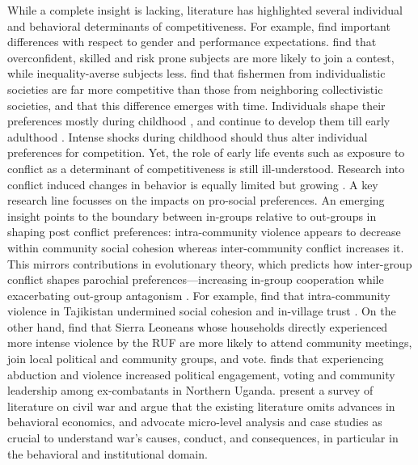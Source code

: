While a complete insight is lacking, literature has highlighted several individual and behavioral determinants of competitiveness. For example, \cite{Niederle2007} find important differences with respect to gender and performance expectations. \cite{Bartling2009b} find that overconfident, skilled and risk prone subjects are more likely to join a contest, while inequality-averse subjects less. \cite{Leibbrandt2013} find that fishermen from individualistic societies are far more competitive than those from neighboring collectivistic societies, and that this difference emerges with time. Individuals shape their preferences mostly during childhood \citep{Benenson2007,Fehr2008}, and continue to develop them till early adulthood \citep{Sutter2007a}. Intense shocks during childhood should thus alter individual preferences for competition. Yet, the role of early life events such as exposure to conflict as a determinant of competitiveness is still ill-understood.
Research into conflict induced changes in behavior is equally limited but growing \citep{Blattman2010b}. A key research line focusses on the impacts on pro-social preferences. An emerging insight points to the boundary between in-groups relative to out-groups in shaping post conflict preferences: intra-community violence appears to decrease within community social cohesion whereas inter-community conflict increases it. This mirrors contributions in evolutionary theory, which predicts how inter-group conflict shapes parochial preferences—increasing in-group cooperation while exacerbating out-group antagonism \citep{Bowles2006b,Bernhard2006b,Choi2007a}. For example, \cite{CassarAlessandra} find that intra-community violence in Tajikistan undermined social cohesion and in-village trust \citep[see also][]{Rohner2013}. On the other hand, \cite{Bellows2009b} find that Sierra Leoneans whose households directly experienced more intense violence by the RUF are more likely to attend community meetings, join local political and community groups, and vote. \cite{Blattman2009a} finds that experiencing abduction and violence increased political engagement, voting and community leadership among ex-combatants in Northern Uganda. \cite{Blattman2010b} present a survey of literature on civil war and argue that the existing literature omits advances in behavioral economics, and advocate micro-level analysis and case studies as crucial to understand war’s causes, conduct, and consequences, in particular in the behavioral and institutional domain.  


